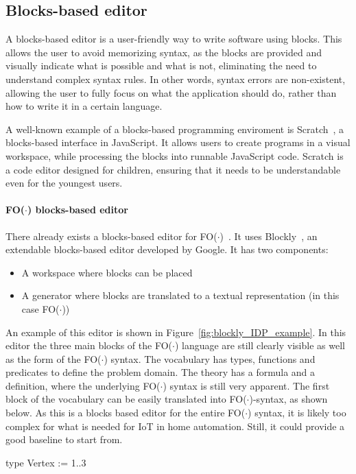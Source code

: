 \documentclass[11pt,a4paper]{report}
\newcommand{\fodot}{FO($\cdot$)\xspace}
\begin{document}
\subsection{Blocks-based editor}
A blocks-based editor is a user-friendly way to write software using blocks. This allows the user to avoid memorizing syntax, as the blocks are provided and visually indicate what is possible and what is not, eliminating the need to understand complex syntax rules. In other words, syntax errors are non-existent, allowing the user to fully focus on what the application should do, rather than how to write it in a certain language.

A well-known example of a blocks-based programming enviroment is Scratch~\cite{scratch}, a blocks-based interface in JavaScript. It allows users to create programs in a visual workspace, while processing the blocks into runnable JavaScript code. Scratch is a code editor designed for children, ensuring that it needs to be understandable even for the youngest users.

\paragraph{\fodot blocks-based editor}
There already exists a blocks-based editor for \fodot~\cite{IDPStructuredBlockbasedEditor}. It uses Blockly~\cite{Blockly}, an extendable blocks-based editor developed by Google. It has two components:
\begin{itemize}
	\item A workspace where blocks can be placed
	\item A generator where blocks are translated to a textual representation (in this case \fodot)
\end{itemize}
An example of this editor is shown in Figure~\ref{fig:blockly_IDP_example}. In this editor the three main blocks of the \fodot language are still clearly visible as well as the form of the \fodot syntax. The vocabulary has types, functions and predicates to define the problem domain. The theory has a formula and a definition, where the underlying \fodot syntax is still very apparent. The first block of the vocabulary can be easily translated into \fodot-syntax, as shown below. As this is a blocks based editor for the entire \fodot syntax, it is likely too complex for what is needed for IoT in home automation. Still, it could provide a good baseline to start from.
\begin{idplisting}
type Vertex := {1..3}
\end{idplisting}
\end{document}
